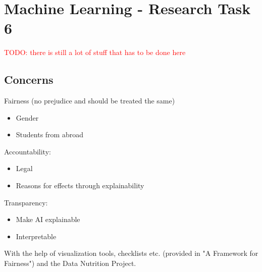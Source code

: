 \section{Machine Learning - Research Task 6}
\textcolor{red}{TODO: there is still a lot of stuff that has to be done here}

\subsection{Concerns}
Fairness (no prejudice and should be treated the same)
\begin{itemize}
    \item Gender
    \item Students from abroad
\end{itemize}

Accountability:
\begin{itemize}
    \item Legal
    \item Reasons for effects through explainability
\end{itemize}

Transparency:
\begin{itemize}
    \item Make AI explainable
    \item Interpretable
\end{itemize}


With the help of visualization tools, checklists etc. (provided in "A Framework for Fairness") and the Data Nutrition Project.

